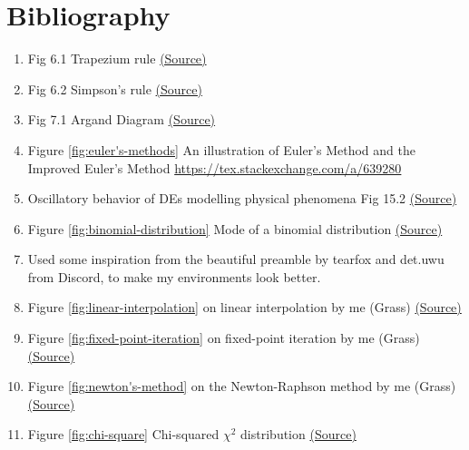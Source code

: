 \documentclass[oneside]{book}
\begin{document}






\chapter{Bibliography}
\begin{enumerate}
  \item Fig 6.1 Trapezium rule \href{https://tex.stackexchange.com/a/110618}{(Source)}
  \item Fig 6.2 Simpson's rule \href{https://tex.stackexchange.com/a/439119}{(Source)}
  \item Fig 7.1 Argand Diagram \href{https://tex.stackexchange.com/a/466846}{(Source)}
  \item Figure \ref{fig:euler's-methods} An illustration of Euler's Method and the Improved Euler's Method \url{https://tex.stackexchange.com/a/639280}
  \item Oscillatory behavior of DEs modelling physical phenomena Fig 15.2 \href{https://tikz.net/dynamics_oscillator/}{(Source)}
  \item Figure \ref{fig:binomial-distribution} Mode of a binomial distribution \href{https://tex.stackexchange.com/a/209658}{(Source)}
  \item Used some inspiration from the beautiful preamble by tearfox and det.uwu from Discord, to make my environments look better.
  \item Figure \ref{fig:linear-interpolation} on linear interpolation by me (Grass) \href{https://www.desmos.com/calculator/jp52nra5le}{(Source)}
  \item Figure \ref{fig:fixed-point-iteration} on fixed-point iteration by me (Grass) \href{https://www.desmos.com/calculator/t9mnqtmhxw}{(Source)}
  \item Figure \ref{fig:newton's-method} on the Newton-Raphson method by me (Grass) \href{https://www.desmos.com/calculator/izkg4ynlfp}{(Source)}
  \item Figure \ref{fig:chi-square} Chi-squared \(\chi^2\) distribution \href{https://commons.wikimedia.org/wiki/File:Chi-square_pdf.svg}{(Source)}
\end{enumerate}
\end{document}
